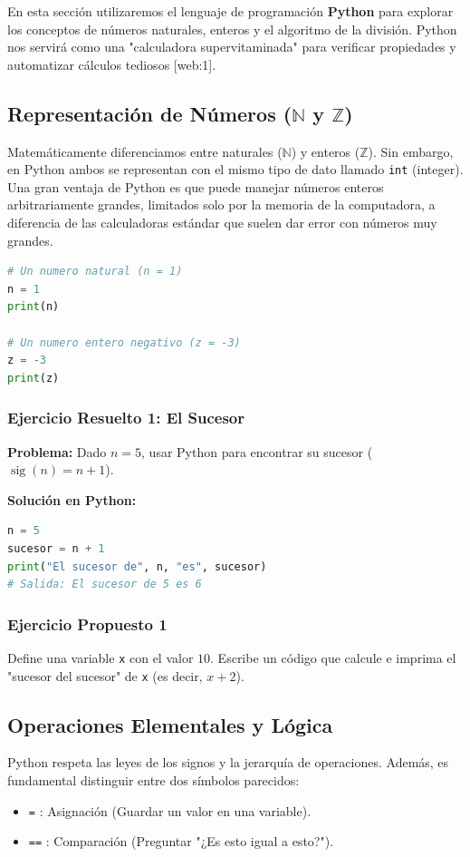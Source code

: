 
En esta sección utilizaremos el lenguaje de programación \textbf{Python} para explorar los conceptos de números naturales, enteros y el algoritmo de la división. Python nos servirá como una "calculadora supervitaminada" para verificar propiedades y automatizar cálculos tediosos [web:1].

\subsection{Representación de Números ($\mathbb{N}$ y $\mathbb{Z}$)}
Matemáticamente diferenciamos entre naturales ($\mathbb{N}$) y enteros ($\mathbb{Z}$). Sin embargo, en Python ambos se representan con el mismo tipo de dato llamado \texttt{int} (integer). Una gran ventaja de Python es que puede manejar números enteros arbitrariamente grandes, limitados solo por la memoria de la computadora, a diferencia de las calculadoras estándar que suelen dar error con números muy grandes.

\begin{lstlisting}[language=Python, caption=Asignación de variables]
# Un numero natural (n = 1)
n = 1 
print(n)

# Un numero entero negativo (z = -3)
z = -3
print(z)
\end{lstlisting}

\subsubsection*{Ejercicio Resuelto 1: El Sucesor}
\textbf{Problema:} Dado $n=5$, usar Python para encontrar su sucesor ($\operatorname{sig}(n) = n+1$).

\textbf{Solución en Python:}
\begin{lstlisting}[language=Python]
n = 5
sucesor = n + 1
print("El sucesor de", n, "es", sucesor)
# Salida: El sucesor de 5 es 6
\end{lstlisting}

\subsubsection*{Ejercicio Propuesto 1}
Define una variable \texttt{x} con el valor $10$. Escribe un código que calcule e imprima el "sucesor del sucesor" de \texttt{x} (es decir, $x+2$).

\subsection{Operaciones Elementales y Lógica}
Python respeta las leyes de los signos y la jerarquía de operaciones. Además, es fundamental distinguir entre dos símbolos parecidos:
\begin{itemize}
    \item \texttt{=} : Asignación (Guardar un valor en una variable).
    \item \texttt{==} : Comparación (Preguntar "¿Es esto igual a esto?").
\end{itemize}

